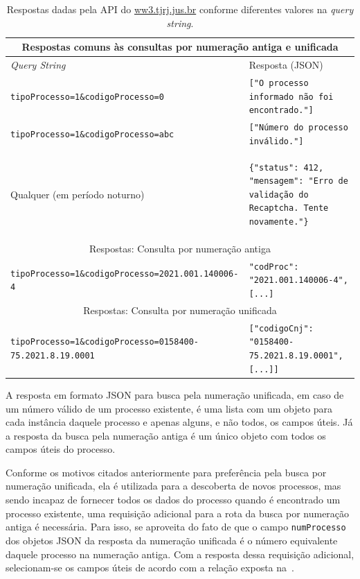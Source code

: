 \begin{table}[htb]
    \tiny
    \centering
    \begin{tabular}{lp{}}
        \toprule
        \multicolumn{2}{c}{Respostas comuns às consultas por numeração antiga e unificada} \\
        \midrule
        \textit{Query String} & Resposta (JSON) \\
        \midrule
        \texttt{tipoProcesso=1\&codigoProcesso=0} & \texttt{["O processo informado não foi encontrado."]} \\
        \texttt{tipoProcesso=1\&codigoProcesso=abc} & \texttt{["Número do processo inválido."]} \\
        Qualquer (em período noturno) & \begin{minipage}{0.6\textwidth}
            \begin{verbatim}
{"status": 412, "mensagem": "Erro de validação do Recaptcha. Tente novamente."}
            \end{verbatim}
        \end{minipage}
        \\
        \midrule
        \multicolumn{2}{c}{Respostas: Consulta por numeração antiga} \\
        \midrule
        \texttt{tipoProcesso=1\&codigoProcesso=2021.001.140006-4} & \texttt{{"codProc": "2021.001.140006-4", [...]}} \\
        \midrule
        \multicolumn{2}{c}{Respostas: Consulta por numeração unificada} \\
        \midrule
        \texttt{tipoProcesso=1\&codigoProcesso=0158400-75.2021.8.19.0001} & \texttt{[{"codigoCnj": "0158400-75.2021.8.19.0001", [...]}]} \\
        \bottomrule
    \end{tabular}
    \caption{%
        Respostas dadas pela API do \url{ww3.tjrj.jus.br} conforme diferentes valores na \textit{query string}.
    }
    \label{tbl:respostas-ww3}
\end{table}

A resposta em formato JSON para busca pela numeração unificada, em caso de um
número válido de um processo existente, é uma lista com um objeto para cada
instância daquele processo e apenas alguns, e não todos, os campos úteis. Já a
resposta da busca pela numeração antiga é um único objeto com todos os campos
úteis do processo.

Conforme os motivos citados anteriormente para preferência pela busca por
numeração unificada, ela é utilizada para a descoberta de novos processos, mas
sendo incapaz de fornecer todos os dados do processo quando é encontrado um
processo existente, uma requisição adicional para a rota da busca por numeração
antiga é necessária. Para isso, se aproveita do fato de que o campo
\texttt{numProcesso} dos objetos JSON da resposta da numeração unificada é o
número equivalente daquele processo na numeração antiga. Com a resposta dessa
requisição adicional, selecionam-se os campos úteis de acordo com a relação
exposta na~.

